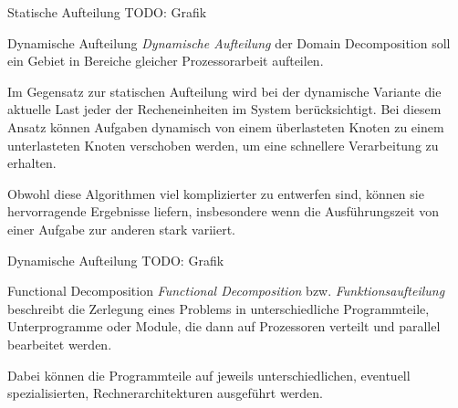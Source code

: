 \begin{example}{Statische Aufteilung}
    TODO: Grafik
\end{example}

\begin{defi}{Dynamische Aufteilung}
    \emph{Dynamische Aufteilung} der Domain Decomposition soll ein Gebiet in Bereiche gleicher Prozessorarbeit aufteilen.
    
    Im Gegensatz zur statischen Aufteilung wird bei der dynamische Variante die aktuelle Last jeder der Recheneinheiten im System berücksichtigt.
    Bei diesem Ansatz können Aufgaben dynamisch von einem überlasteten Knoten zu einem unterlasteten Knoten verschoben werden, um eine schnellere Verarbeitung zu erhalten.
    
    Obwohl diese Algorithmen viel komplizierter zu entwerfen sind, können sie hervorragende Ergebnisse liefern, insbesondere wenn die Ausführungszeit von einer Aufgabe zur anderen stark variiert.
    
\end{defi}

\begin{example}{Dynamische Aufteilung}
    TODO: Grafik
\end{example}

\begin{defi}{Functional Decomposition}
    \emph{Functional Decomposition} bzw. \emph{Funktionsaufteilung} beschreibt die Zerlegung eines Problems in unterschiedliche Programmteile, Unterprogramme oder Module, die dann auf Prozessoren verteilt und parallel bearbeitet werden.
    
    Dabei können die Programmteile auf jeweils unterschiedlichen, eventuell spezialisierten, Rechnerarchitekturen ausgeführt werden.
\end{defi}

